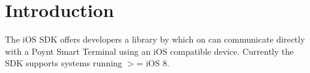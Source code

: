 \hypertarget{index_intro_sec}{}\section{Introduction}\label{index_intro_sec}
The i\+OS S\+DK offers developers a library by which on can communicate directly with a Poynt Smart Terminal using an i\+OS compatible device. Currently the S\+DK supports systems running $>$= i\+OS 8. 